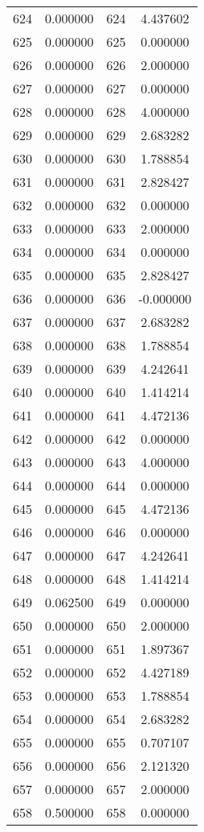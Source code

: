 \documentclass[12pt]{article}
\begin{document}
\begin{longtable}{@{}cccc@{}}
624 & 0.000000 & 624 & 4.437602 \\
625 & 0.000000 & 625 & 0.000000 \\
626 & 0.000000 & 626 & 2.000000 \\
627 & 0.000000 & 627 & 0.000000 \\
628 & 0.000000 & 628 & 4.000000 \\
629 & 0.000000 & 629 & 2.683282 \\
630 & 0.000000 & 630 & 1.788854 \\
631 & 0.000000 & 631 & 2.828427 \\
632 & 0.000000 & 632 & 0.000000 \\
633 & 0.000000 & 633 & 2.000000 \\
634 & 0.000000 & 634 & 0.000000 \\
635 & 0.000000 & 635 & 2.828427 \\
636 & 0.000000 & 636 & -0.000000 \\
637 & 0.000000 & 637 & 2.683282 \\
638 & 0.000000 & 638 & 1.788854 \\
639 & 0.000000 & 639 & 4.242641 \\
640 & 0.000000 & 640 & 1.414214 \\
641 & 0.000000 & 641 & 4.472136 \\
642 & 0.000000 & 642 & 0.000000 \\
643 & 0.000000 & 643 & 4.000000 \\
644 & 0.000000 & 644 & 0.000000 \\
645 & 0.000000 & 645 & 4.472136 \\
646 & 0.000000 & 646 & 0.000000 \\
647 & 0.000000 & 647 & 4.242641 \\
648 & 0.000000 & 648 & 1.414214 \\
649 & 0.062500 & 649 & 0.000000 \\
650 & 0.000000 & 650 & 2.000000 \\
651 & 0.000000 & 651 & 1.897367 \\
652 & 0.000000 & 652 & 4.427189 \\
653 & 0.000000 & 653 & 1.788854 \\
654 & 0.000000 & 654 & 2.683282 \\
655 & 0.000000 & 655 & 0.707107 \\
656 & 0.000000 & 656 & 2.121320 \\
657 & 0.000000 & 657 & 2.000000 \\
658 & 0.500000 & 658 & 0.000000 \\

\end{longtable}
\end{document}
